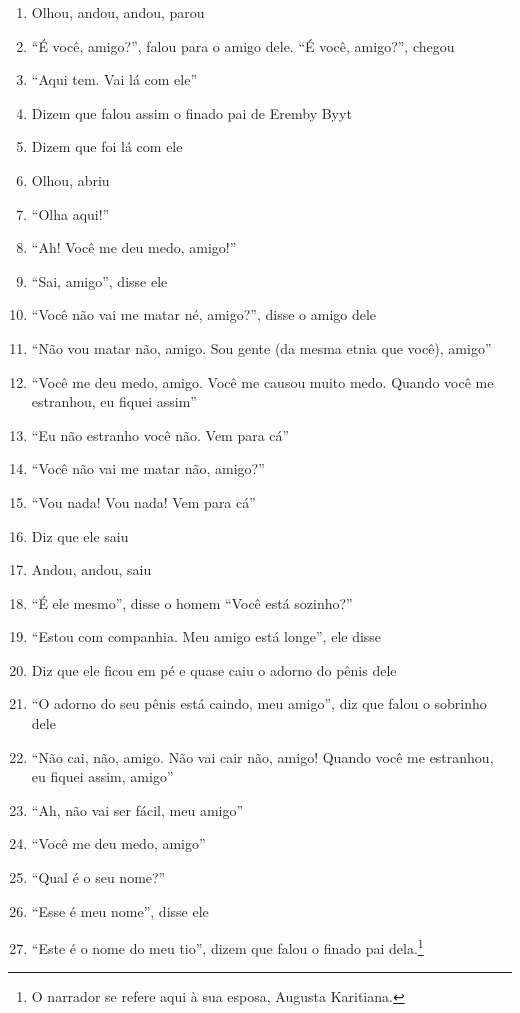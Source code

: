 \begin{enumerate}
 \item Olhou, andou, andou, parou
 \item ``É você, amigo?'', falou para o amigo dele. ``É você, amigo?'', chegou
 \item ``Aqui tem.  Vai lá com ele''
 \item Dizem que falou assim o finado pai de Eremby Byyt
 \item Dizem que foi lá com ele
 \item Olhou, abriu
 \item ``Olha aqui!''
 \item ``Ah! Você me deu medo, amigo!''
 \item ``Sai, amigo'', disse ele
 \item ``Você não vai me matar né, amigo?'', disse o amigo dele
 \item ``Não vou matar não, amigo. Sou gente (da mesma etnia que você), amigo''
 \item ``Você me deu medo, amigo. Você me causou muito medo. Quando você me
 estranhou, eu fiquei assim''
 \item ``Eu não estranho você não. Vem para cá''
 \item ``Você não vai me matar não, amigo?''
 \item ``Vou nada! Vou nada! Vem para cá''
 \begin{center}\end{center}
 \item Diz que ele saiu
 \item Andou, andou, saiu
 \item ``É ele mesmo'', disse o homem ``Você está sozinho?''
 \item ``Estou com companhia. Meu amigo está longe'', ele disse
 \item Diz que ele ficou em pé e quase caiu o adorno do pênis dele
 \item ``O adorno do seu pênis está caindo, meu amigo'', diz que falou o
 sobrinho dele
 \item ``Não cai, não, amigo. Não vai cair não, amigo! Quando você me
 estranhou, eu fiquei assim, amigo''
 \item ``Ah, não vai ser fácil, meu amigo''
 \item ``Você me deu medo, amigo''
 \item ``Qual é o seu nome?''
 \item ``Esse é meu nome'', disse ele
 \item ``Este é o nome do meu tio'', dizem que falou o finado pai
 dela.\footnote{O narrador se refere aqui à sua esposa, Augusta Karitiana.}

\end{enumerate}
